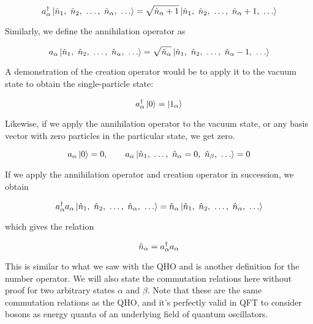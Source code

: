 \begin{equation}
	\ad_{\alpha} \ket{\hat{n}_1,\ \hat{n}_2,\ \dots,\ \hat{n}_{\alpha},\ \dots} = \sqrt{\hat{n}_{\alpha}+1}\ket{\hat{n}_1,\ \hat{n}_2,\ \dots,\ \hat{n}_{\alpha}+1,\ \dots}
\end{equation} 

Similarly, we define the annihilation operator as

\begin{equation}
a_{\alpha} \ket{\hat{n}_1,\ \hat{n}_2,\ \dots,\ \hat{n}_{\alpha},\ \dots} = \sqrt{\hat{n}_{\alpha}}\ket{\hat{n}_1,\ \hat{n}_2,\ \dots,\ \hat{n}_{\alpha}-1,\ \dots}
\end{equation} 

A demonstration of the creation operator would be to apply it to the vacuum state to obtain the single-particle state:

\begin{equation}
	a^{\dagger}_{\alpha} \ket{0} = \ket{1_{\alpha}}
\end{equation}

Likewise, if we apply the annihilation operator to the vacuum state, or any basis vector with zero particles in the particular state, we get zero.

\begin{equation}
	a_{\alpha} \ket{0} = 0, \qquad a_{\alpha} \ket{\hat{n}_1,\ \dots,\ \hat{n}_{\alpha}=0,\ \hat{n}_{\beta},\ \dots} = 0
\end{equation}

If we apply the annihilation operator and creation operator in succession, we obtain

\begin{equation*}
\ad_{\alpha} a_{\alpha} \ket{\hat{n}_1,\ \hat{n}_2,\ \dots,\ \hat{n}_{\alpha},\ \dots} = \hat{n}_{\alpha}\ket{\hat{n}_1,\ \hat{n}_2,\ \dots,\ \hat{n}_{\alpha},\ \dots}
\end{equation*}

\noindent which gives the relation

\begin{equation}
	\hat{n}_{\alpha} = a^{\dagger}_{\alpha}a_{\alpha}
\end{equation}

This is similar to what we saw with the QHO and is another definition for the number operator. 
We will also state the commutation relations here without proof for two arbitrary states $\alpha$ and $\beta$. 
Note that these are the same commutation relations as the QHO, and it's perfectly valid in QFT to consider bosons as energy quanta of an underlying field of quantum oscillators.

